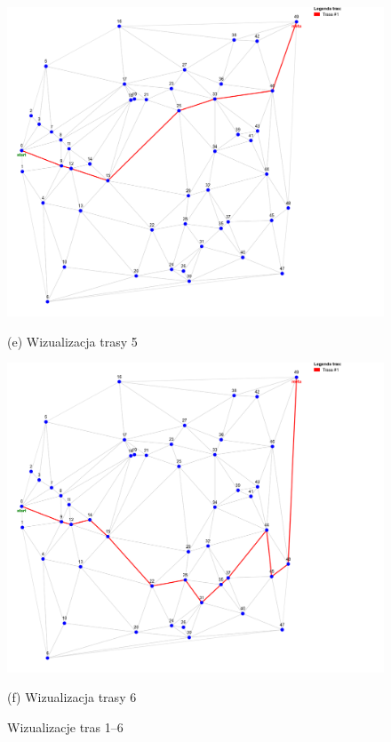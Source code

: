 \documentclass{article}
\begin{document}
\begin{figure}[H]
    \begin{minipage}[b]{0.48\linewidth}
        \includegraphics[width=\linewidth]{5.png}
        \caption*{(e) Wizualizacja trasy 5}
    \end{minipage}
    \hfill
    \begin{minipage}[b]{0.48\linewidth}
        \includegraphics[width=\linewidth]{6.png}
        \caption*{(f) Wizualizacja trasy 6}
    \end{minipage}

    \caption{Wizualizacje tras 1–6}
    \label{fig:routes-1-6}
\end{figure}
\end{document}
